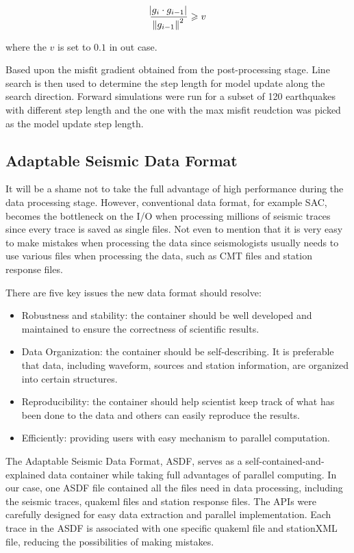 \documentclass[extra,mreferee]{gji}
\begin{document}
\begin{equation}
  \frac { \abs{g_i \cdot g_{i-1}} }  {\norm{g_{i-1}}^2} \geqslant v
\end{equation}

where the $v$ is set to $0.1$ in out case.

Based upon the misfit gradient obtained from the post-processing stage.
Line search is then used to determine the step length for model update
along the search direction. Forward simulations were run for a subset
of 120 earthquakes with different step length and the one with
the max misfit reudction was picked as the model update step length.

\subsection{Adaptable Seismic Data Format}

It will be a shame not to take the full advantage of high performance during the data processing stage. However, conventional data format, for example SAC, becomes the bottleneck on the I/O when processing millions of seismic traces since every trace is saved as single files. Not even to mention that it is very easy to make mistakes when processing the data since seismologists usually needs to use various files when processing the data, such as CMT files and station response files.

There are five key issues the new data format should resolve:
\begin{itemize}
    \item Robustness and stability: the container should be well developed and maintained to ensure the correctness of scientific results.
    \item Data Organization: the container should be self-describing. It is preferable that data, including waveform, sources and station information, are organized into certain structures.
    \item Reproducibility: the container should help scientist keep track of what has been done to the data and others can easily reproduce the results.
    \item Efficiently: providing users with easy mechanism to parallel computation.

\end{itemize}

The Adaptable Seismic Data Format, ASDF, serves as a self-contained-and-explained data container while taking full advantages of parallel computing. In our case, one ASDF file contained all the files need in data processing, including the seismic traces, quakeml files and station response files. The APIs were carefully designed for easy data extraction and parallel implementation. Each trace in the ASDF is associated with one specific quakeml file and stationXML file, reducing the possibilities of making mistakes.
\end{document}
